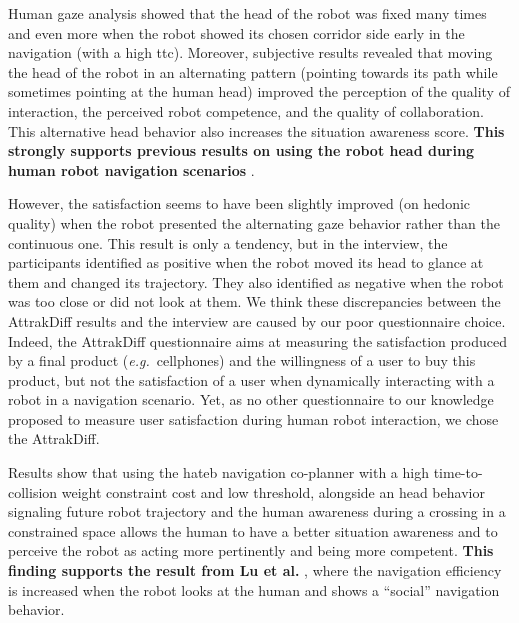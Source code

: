 \documentclass[a4paper,11pt,twoside]{StyleThese}
\begin{document}
Human gaze analysis showed that the head of the robot was fixed many times and even more when the robot showed its chosen corridor side early in the navigation (with a high \acrshort{ttc}). Moreover, subjective results revealed that moving the head of the robot in an alternating pattern (pointing towards its path while sometimes pointing at the human head) improved the perception of the quality of interaction, the perceived robot competence, and the quality of collaboration. This alternative head behavior also increases the situation awareness score. \textbf{This strongly supports previous results on using the robot head during human robot navigation scenarios} \cite{khambhaita_head-body_2016, may_show_2015}.

However, the satisfaction seems to have been slightly improved (on hedonic quality) when the robot presented the alternating gaze behavior rather than the continuous one. This result is only a tendency, but in the interview, the participants identified as positive when the robot moved its head to glance at them and changed its trajectory. They also identified as negative when the robot was too close or did not look at them. We think these discrepancies between the AttrakDiff results and the interview are caused by our poor questionnaire choice. Indeed, the AttrakDiff questionnaire aims at measuring the satisfaction produced by a final product (\textit{e.g.}~cellphones) and the willingness of a user to buy this product, but not the satisfaction of a user when dynamically interacting with a robot in a navigation scenario. Yet, as no other questionnaire to our knowledge proposed to measure user satisfaction during human robot interaction, we chose the AttrakDiff.

Results show that using the \acrshort{hateb} navigation co-planner with a high time-to-collision weight constraint cost and low threshold, alongside an head behavior signaling future robot trajectory and the human awareness during a crossing in a constrained space allows the human to have a better situation awareness and to perceive the robot as acting more pertinently and being more competent. \textbf{This finding supports the result from Lu et al.} \cite{lu_towards_2013}, where the navigation efficiency is increased when the robot looks at the human and shows a ``social'' navigation behavior.
\end{document}
